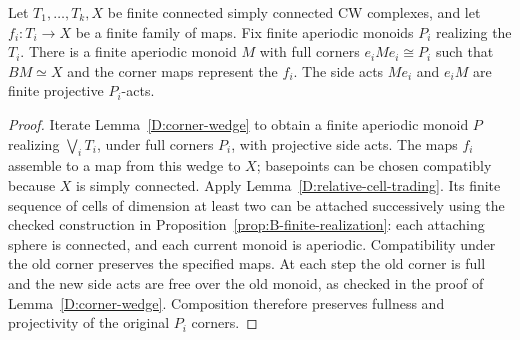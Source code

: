 \begin{proposition}
\label{D:simultaneous-corners}
Let $T_1,\ldots,T_k,X$ be finite connected simply connected CW complexes,
and let $f_i:T_i\to X$ be a finite family of maps. Fix finite aperiodic
monoids $P_i$ realizing the $T_i$. There is a finite aperiodic monoid $M$
with full corners $e_iMe_i\cong P_i$ such that $BM\simeq X$ and the corner
maps represent the $f_i$. The side acts $Me_i$ and $e_iM$ are finite
projective $P_i$-acts.
\end{proposition}
\begin{proof}
Iterate Lemma~\ref{D:corner-wedge} to obtain a finite aperiodic monoid $P$
realizing $\bigvee_i T_i$, under full corners $P_i$, with projective side
acts. The maps $f_i$ assemble to a map from this wedge to $X$; basepoints
can be chosen compatibly because $X$ is simply connected. Apply
Lemma~\ref{D:relative-cell-trading}. Its finite sequence of cells of
dimension at least two can be attached successively using the checked
construction in Proposition~\ref{prop:B-finite-realization}: each attaching
sphere is connected, and each current monoid is aperiodic. Compatibility
under the old corner preserves the specified maps. At each step the old
corner is full and the new side acts are free over the old monoid, as
checked in the proof of Lemma~\ref{D:corner-wedge}. Composition therefore
preserves fullness and projectivity of the original $P_i$ corners.
\end{proof}

